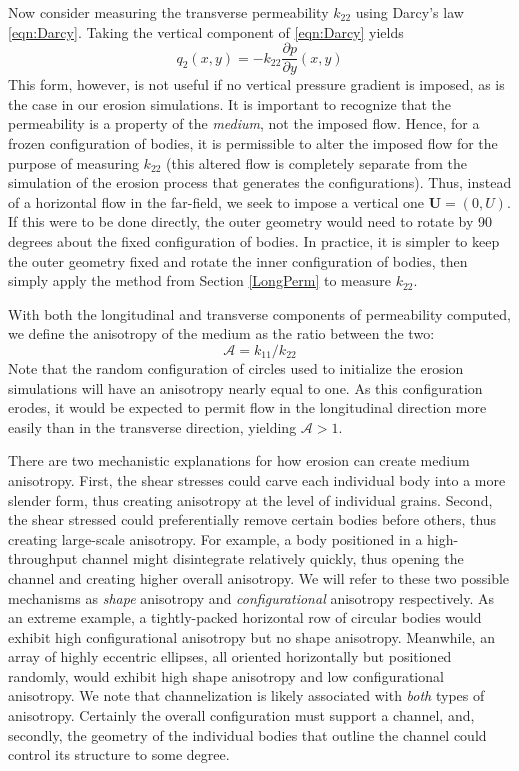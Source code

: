 \documentclass[3p]{elsarticle}
\newcommand{\UU}{{\mathbf{U}}}
\newcommand{\pderiv}[2]{\frac{\partial #1}{\partial #2}}
\newcommand{\anis}{\mathcal{A}}
\begin{document}
Now consider measuring the transverse permeability $k_{22}$ using Darcy's law \eqref{eqn:Darcy}. Taking the vertical component of \eqref{eqn:Darcy} yields
\begin{equation}
\label{q1}
q_2(x,y) = -k_{22} \pderiv{p}{y}(x,y)
\end{equation}
This form, however, is not useful if no vertical pressure gradient is imposed, as is the case in our erosion simulations. It is important to recognize that the permeability is a property of the {\em medium}, not the imposed flow. Hence, for a frozen configuration of bodies, it is permissible to alter the imposed flow for the purpose of measuring $k_{22}$ (this altered flow is completely separate from the simulation of the erosion process that generates the configurations). Thus, instead of a horizontal flow in the far-field, we seek to impose a vertical one $\UU = (0,U)$.
If this were to be done directly, the outer geometry would need to rotate by 90 degrees about the fixed configuration of bodies. In practice, it is simpler to keep the outer geometry fixed and rotate the inner configuration of bodies, then simply apply the method from Section \ref{LongPerm} to measure $k_{22}$.

With both the longitudinal and transverse components of permeability computed, we define the anisotropy of the medium as the ratio between the two:
\begin{equation}
\anis = k_{11} / k_{22}
\end{equation}
Note that the random configuration of circles used to initialize the erosion simulations will have an anisotropy nearly equal to one. As this configuration erodes, it would be expected to permit flow in the longitudinal direction more easily than in the transverse direction, yielding $\anis > 1$.

There are two mechanistic explanations for how erosion can create medium anisotropy. First, the shear stresses could carve each individual body into a more slender form, thus creating anisotropy at the level of individual grains. Second, the shear stressed could preferentially remove certain bodies before others, thus creating large-scale anisotropy. For example, a body positioned in a high-throughput channel might disintegrate relatively quickly, thus opening the channel and creating higher overall anisotropy. We will refer to these two possible mechanisms as {\em shape} anisotropy and {\em configurational} anisotropy respectively. As an extreme example, a tightly-packed horizontal row of circular bodies would exhibit high configurational anisotropy but no shape anisotropy. Meanwhile, an array of highly eccentric ellipses, all oriented horizontally but positioned randomly, would exhibit high shape anisotropy and low configurational anisotropy. We note that channelization is likely associated with {\em both} types of anisotropy. Certainly the overall configuration must support a channel, and, secondly, the geometry of the individual bodies that outline the channel could control its structure to some degree.
\end{document}
